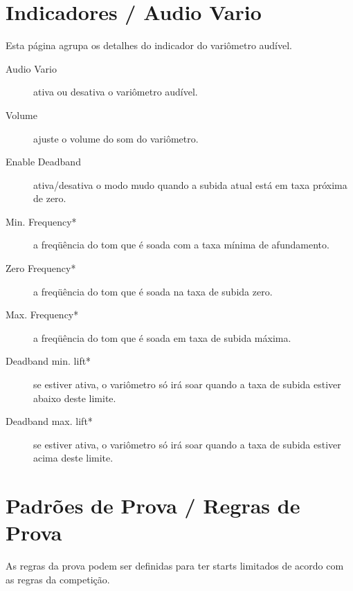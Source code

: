 \section{Indicadores / Audio Vario}\label{sec:audiovario-gauge}

Esta página agrupa os detalhes do indicador do variômetro audível. \label{conf:audiovariogauge}

\begin{description}
\item[Audio Vario]  ativa ou desativa o variômetro audível.
\item[Volume]  ajuste o volume do som do variômetro.
\item[Enable Deadband]  ativa/desativa o modo mudo quando a subida atual está em taxa próxima de zero.
\item[Min. Frequency*]  a freqüência do tom que é soada com a taxa mínima de afundamento.
\item[Zero Frequency*]  a freqüência do tom que é soada na taxa de subida zero.
\item[Max. Frequency*]  a freqüência do tom que é soada em taxa de subida máxima.
\item[Deadband min. lift*]  se estiver ativa, o variômetro só irá soar quando a taxa de subida estiver abaixo deste limite.
\item[Deadband max. lift*]  se estiver ativa, o variômetro só irá soar quando a taxa de subida estiver acima deste limite.
\end{description}


\section{Padrões de Prova / Regras de Prova}

As regras da prova podem ser definidas para ter starts limitados de acordo com as regras da competição. \label{conf:taskrules}

